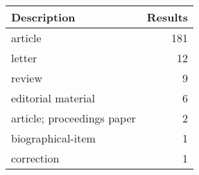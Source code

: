 
\begin{tabular}{lr}
\toprule
Description & Results\\
\midrule
article & 181\\
letter & 12\\
review & 9\\
editorial material & 6\\
article; proceedings paper & 2\\
\addlinespace
biographical-item & 1\\
correction & 1\\
\bottomrule
\end{tabular}